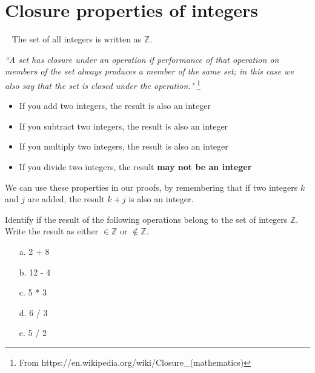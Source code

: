     \section*{Closure properties of integers}

        \begin{intro}{\ }
            The set of all integers is written as $\mathbb{Z}$.

            \begin{center}
                \textit{``A set has closure under an operation if
                performance of that operation on members of the set
                always produces a member of the same set; in this
                case we also say that the set is closed under the operation."}
                \footnote{From https://en.wikipedia.org/wiki/Closure\_(mathematics)}
            \end{center}

            \begin{itemize}
                \item   If you add two integers, the result is also an integer
                \item   If you subtract two integers, the result is also an integer
                \item   If you multiply two integers, the result is also an integer
                \item   If you divide two integers, the result \textbf{may not be an integer}
            \end{itemize}

            We can use these properties in our proofs, by remembering that
            if two integers $k$ and $j$ are added, the result $k+j$ is also an integer.
        \end{intro}


        \begin{questionNOGRADE}{\thequestion}
            Identify if the result of the following operations belong to the set of integers $\mathbb{Z}$.
            Write the result as either $\in \mathbb{Z}$ or $\not\in \mathbb{Z}$.

            \begin{enumerate}
                \item[a.] 2 + 8
                \item[b.] 12 - 4
                \item[c.] 5 * 3
                \item[d.] 6 / 3
                \item[e.] 5 / 2
            \end{enumerate}
        \end{questionNOGRADE}

